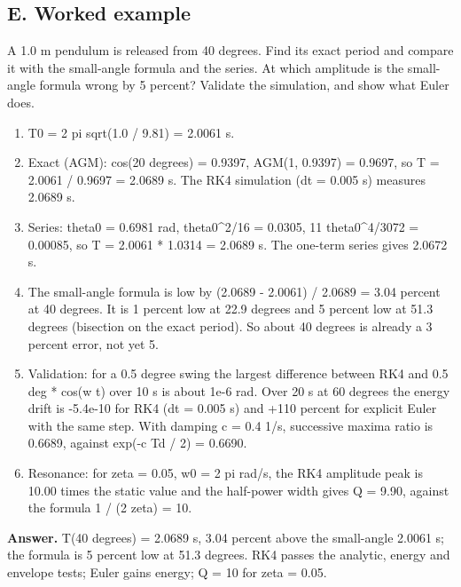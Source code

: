 \documentclass[11pt,a4paper]{article}
\begin{document}
\subsection*{E. Worked example}
A 1.0 m pendulum is released from 40 degrees. Find its exact period and compare it with the small-angle formula and the series. At which amplitude is the small-angle formula wrong by 5 percent? Validate the simulation, and show what Euler does.
\begin{enumerate}[nosep]
\item T0 = 2 pi sqrt(1.0 / 9.81) = 2.0061 s.
\item Exact (AGM): cos(20 degrees) = 0.9397, AGM(1, 0.9397) = 0.9697, so T = 2.0061 / 0.9697 = 2.0689 s. The RK4 simulation (dt = 0.005 s) measures 2.0689 s.
\item Series: theta0 = 0.6981 rad, theta0\textasciicircum{}2/16 = 0.0305, 11 theta0\textasciicircum{}4/3072 = 0.00085, so T = 2.0061 * 1.0314 = 2.0689 s. The one-term series gives 2.0672 s.
\item The small-angle formula is low by (2.0689 - 2.0061) / 2.0689 = 3.04 percent at 40 degrees. It is 1 percent low at 22.9 degrees and 5 percent low at 51.3 degrees (bisection on the exact period). So about 40 degrees is already a 3 percent error, not yet 5.
\item Validation: for a 0.5 degree swing the largest difference between RK4 and 0.5 deg * cos(w t) over 10 s is about 1e-6 rad. Over 20 s at 60 degrees the energy drift is -5.4e-10 for RK4 (dt = 0.005 s) and +110 percent for explicit Euler with the same step. With damping c = 0.4 1/s, successive maxima ratio is 0.6689, against exp(-c Td / 2) = 0.6690.
\item Resonance: for zeta = 0.05, w0 = 2 pi rad/s, the RK4 amplitude peak is 10.00 times the static value and the half-power width gives Q = 9.90, against the formula 1 / (2 zeta) = 10.
\end{enumerate}
\textbf{Answer.} T(40 degrees) = 2.0689 s, 3.04 percent above the small-angle 2.0061 s; the formula is 5 percent low at 51.3 degrees. RK4 passes the analytic, energy and envelope tests; Euler gains energy; Q = 10 for zeta = 0.05.
\end{document}
